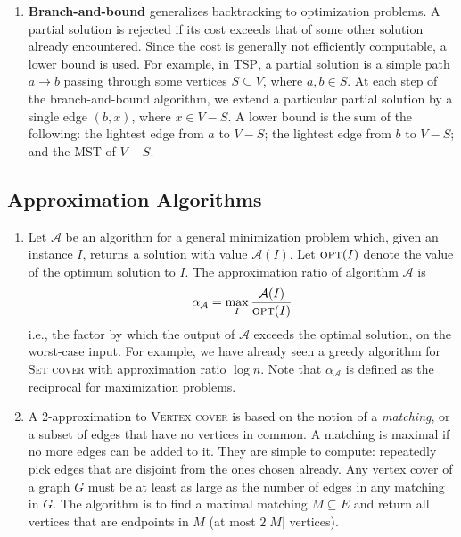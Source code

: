 \documentclass[10pt]{article}
\begin{document}
\begin{multicols}{2}
\begin{addmargin}[0.8em]{0.5em}
\begin{enumerate}[label=(\alph*)]
        \item \textbf{Branch-and-bound} generalizes backtracking to optimization problems. A partial solution is rejected if its cost exceeds that of some other solution already encountered. Since the cost is generally not efficiently computable, a lower bound is used. For example, in \textsc{TSP}, a partial solution is a simple path $a \to b$ passing through some vertices $S \subseteq V$, where $a,b \in S$. At each step of the branch-and-bound algorithm, we extend a particular partial solution by a single edge $(b,x)$, where $x \in V-S$. A lower bound is the sum of the following: the lightest edge from $a$ to $V - S$; the lightest edge from $b$ to $V - S$; and the MST of $V - S$.
    \end{enumerate}
    \vspace{-0.6cm}
    \subsection{Approximation Algorithms}
    \vspace{-0.2cm}
    \begin{enumerate}[label=(\alph*)]
        \item Let $\mathcal{A}$ be an algorithm for a general minimization problem which, given an instance $I$, returns a solution with value $\mathcal{A}(I)$. Let $\textsc{opt}(I)$ denote the value of the optimum solution to $I$. The approximation ratio of algorithm $\mathcal{A}$ is 
        $$
        \alpha_\mathcal{A} = \max_I \frac{\mathcal{A}(I)}{\textsc{opt}(I)}
        $$
        i.e., the factor by which the output of $\mathcal{A}$ exceeds the optimal solution, on the worst-case input. For example, we have already seen a greedy algorithm for \textsc{Set cover} with approximation ratio $\log{n}$. Note that $\alpha_\mathcal{A}$ is defined as the reciprocal for maximization problems.
        
        \item A 2-approximation to \textsc{Vertex cover} is based on the notion of a \textit{matching}, or a subset of edges that have no vertices in common. A matching is maximal if no more edges can be added to it. They are simple to compute: repeatedly pick edges that are disjoint from the ones chosen already. Any vertex cover of a graph $G$ must be at least as large as the number of edges in any matching in $G$. The algorithm is to find a maximal matching $M \subseteq E$ and return all vertices that are endpoints in $M$ (at most $2|M|$ vertices).
        

\end{enumerate}
\end{addmargin}
\end{multicols}
\end{document}
